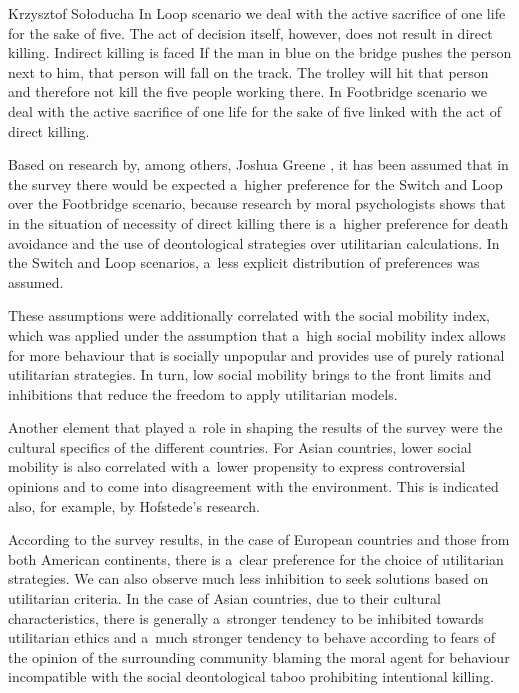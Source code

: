 \begin{artengenv}{Krzysztof Sołoducha}
In Loop scenario we deal with the active sacrifice of one life for the sake of five. The act of decision itself, however, does not result in direct killing. Indirect killing is faced If the man in blue on the bridge pushes the person next to him, that person will fall on the track. The trolley will hit that person and therefore not kill the five people working there. In Footbridge scenario we deal with the active sacrifice of one life for the sake of five linked with the act of direct killing.

Based on research by, among others, Joshua Greene
\parencite*[][]{greene_moral_2013}, %
 it has been assumed that in the survey there would be expected a~higher preference for the Switch and Loop over the Footbridge scenario, because research by moral psychologists shows that in the situation of necessity of direct killing there is a~higher preference for death avoidance and the use of deontological strategies over utilitarian calculations. In the Switch and Loop scenarios, a~less explicit distribution of preferences was assumed.

These assumptions were additionally correlated with the social mobility index, which was applied under the assumption that a~high social mobility index allows for more behaviour that is socially unpopular and provides use of purely rational utilitarian strategies. In turn, low social mobility brings to the front limits and inhibitions that reduce the freedom to apply utilitarian models.

Another element that played a~role in shaping the results of the survey were the cultural specifics of the different countries. For Asian countries, lower social mobility is also correlated with a~lower propensity to express controversial opinions and to come into disagreement with the environment. This is indicated also, for example, by Hofstede's research.

According to the survey results, in the case of European countries and those from both American continents, there is a~clear preference for the choice of utilitarian strategies. We can also observe much less inhibition to seek solutions based on utilitarian criteria. In the case of Asian countries, due to their cultural characteristics, there is generally a~stronger tendency to be inhibited towards utilitarian ethics and a~much stronger tendency to behave according to fears of the opinion of the surrounding community blaming the moral agent for behaviour incompatible with the social deontological taboo prohibiting intentional killing.


\end{artengenv}
